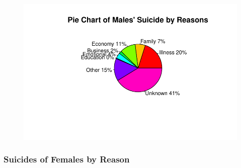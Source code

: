 \documentclass[
  11pt,
  a4paper,
  DIV=11,
  numbers=noendperiod]{scrartcl}
\begin{document}
\begin{figure}[H]

{\centering \includegraphics{analysis_files/figure-pdf/unnamed-chunk-17-1.pdf}

}

\end{figure}

\hypertarget{suicides-of-females-by-reason}{%
\subsubsection{\texorpdfstring{\textbf{Suicides of Females by
Reason}}{Suicides of Females by Reason}}\label{suicides-of-females-by-reason}}
\end{document}
